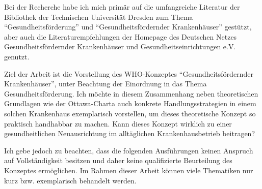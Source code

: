 Bei der Recherche habe ich mich primär auf die umfangreiche Literatur der Bibliothek der Technischen Universität Dresden zum Thema "`Gesundheitsförderung"' und "`Gesundheitsfördernder Krankenhäuser"' gestützt, aber auch die Literaturempfehlungen der Homepage des Deutschen Netzes Gesundheitsfördernder Krankenhäuser und Gesundheitseinrichtungen e.V. genutzt.
 
Ziel der Arbeit ist die Vorstellung des WHO-Konzeptes "`Gesundheitsfördernder Krankenhäuser"', unter Beachtung der Einordnung in das Thema Gesundheitsförderung. Ich möchte in diesem Zusammenhang neben theoretischen Grundlagen wie der Ottawa-Charta auch konkrete Handlungsstrategien in einem solchen Krankenhaus exemplarisch vorstellen, um dieses theoretische Konzept so praktisch handhabbar zu machen. Kann dieses Konzept wirklich zu einer gesundheitlichen Neuausrichtung im alltäglichen Krankenhausbetrieb beitragen?

Ich gebe jedoch zu beachten, dass die folgenden Ausführungen keinen Anspruch auf Vollständigkeit besitzen und daher keine qualifizierte Beurteilung des Konzeptes ermöglichen. Im Rahmen dieser Arbeit können viele Thematiken nur kurz bzw. exemplarisch behandelt werden. 

